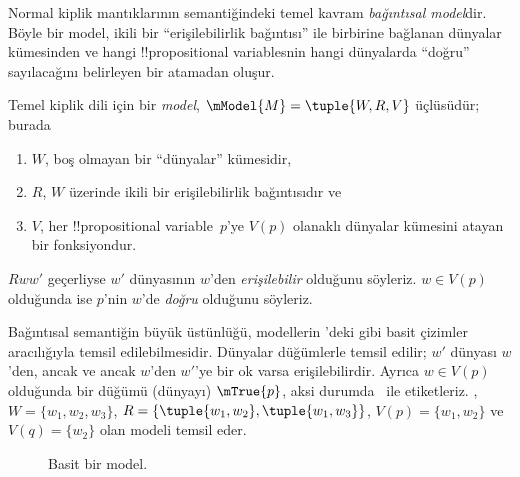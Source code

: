 \documentclass[../../../include/open-logic-section]{subfiles}
\begin{document}


Normal kiplik mantıklarının semantiğindeki temel kavram \emph{bağıntısal
model}dir. Böyle bir model, ikili bir ``erişilebilirlik bağıntısı'' ile
birbirine bağlanan dünyalar kümesinden ve hangi !!{propositional variable}s{}nin
hangi dünyalarda ``doğru'' sayılacağını belirleyen bir atamadan oluşur.

\begin{defn}
  Temel kiplik dili için bir \emph{model}, $\mModel{M} = \tuple{W, R, V}$
  üçlüsüdür; burada
  \begin{enumerate}
  \item $W$, boş olmayan bir ``dünyalar'' kümesidir,
  \item $R$, $W$ üzerinde ikili bir erişilebilirlik bağıntısıdır ve
  \item $V$, her !!{propositional variable}~$p$'ye $V(p)$ olanaklı
    dünyalar kümesini atayan bir fonksiyondur.
  \end{enumerate}
  $Rww'$ geçerliyse $w'$ dünyasının $w$'den \emph{erişilebilir} olduğunu
  söyleriz. $w \in V(p)$ olduğunda ise $p$'nin $w$'de \emph{doğru}
  olduğunu söyleriz.
\end{defn}

Bağıntısal semantiğin büyük üstünlüğü, modellerin 'deki
gibi basit çizimler aracılığıyla temsil edilebilmesidir. Dünyalar düğümlerle
temsil edilir; $w'$ dünyası $w$'den, ancak ve ancak $w$'den $w'$'ye bir ok
varsa erişilebilirdir. Ayrıca $w \in V(p)$ olduğunda bir düğümü (dünyayı)
$\mTrue{p}$, aksi durumda~ ile etiketleriz.
, $W = \{w_1, w_2, w_3\}$,
$R = \{\tuple{w_1, w_2},\tuple{w_1, w_3}\}$,
$V(p) = \{w_1, w_2\}$ ve $V(q) = \{w_2\}$ olan modeli temsil eder.

\begin{figure}
  \begin{center}
  \end{center}
  \caption{Basit bir model.}
\end{figure}
\end{document}
